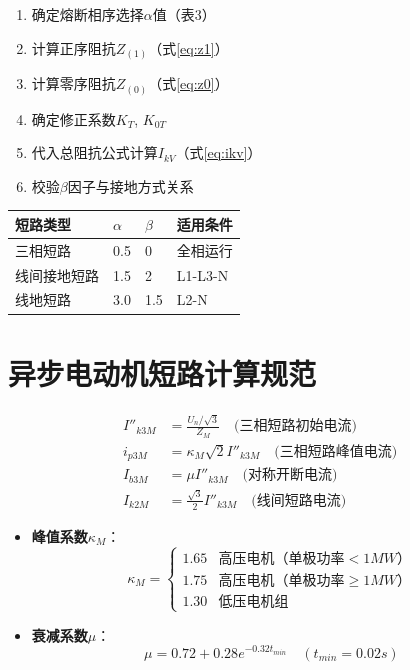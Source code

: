 \documentclass[a4paper,11pt,AutoFakeBold]{ctexart}
\begin{document}
\begin{enumerate}
\item 确定熔断相序选择$\alpha$值（表3）
\item 计算正序阻抗$Z_{(1)}$（式\ref{eq:z1}）
\item 计算零序阻抗$Z_{(0)}$（式\ref{eq:z0}）
\item 确定修正系数$K_T$, $K_{0T}$
\item 代入总阻抗公式计算$I_{kV}$（式\ref{eq:ikv}）
\item 校验$\beta$因子与接地方式关系
\end{enumerate}


\begin{tabular}{llll}
短路类型 & $\alpha$ & $\beta$ & 适用条件 \\
\hline
三相短路 & 0.5 & 0 & 全相运行 \\
线间接地短路 & 1.5 & 2 & L1-L3-N \\
线地短路 & 3.0 & 1.5 & L2-N \\
\end{tabular}

\newpage
\section{异步电动机短路计算规范}

\begin{align}
I''_{k3M} &= \frac{U_n/\sqrt{3}}{Z_M} \quad \text{(三相短路初始电流)} \label{eq:ik3m} \\
i_{p3M} &= \kappa_M \sqrt{2} I''_{k3M} \quad \text{(三相短路峰值电流)} \label{eq:ip3m} \\
I_{b3M} &= \mu I''_{k3M} \quad \text{(对称开断电流)} \label{eq:ib3m} \\
I_{k2M} &= \frac{\sqrt{3}}{2} I''_{k3M} \quad \text{(线间短路电流)} \label{eq:ik2m}
\end{align}


\begin{itemize}
\item \textbf{峰值系数$\kappa_M$}：
  \[
  \kappa_M = 
  \begin{cases}
  1.65 & \text{高压电机（单极功率}< 1 MW ） \\
  1.75 & \text{高压电机（单极功率}\geq 1 MW） \\
  1.30 & \text{低压电机组}
  \end{cases}
  \]
  
\item \textbf{衰减系数$\mu$}：
  \[
  \mu = 0.72 + 0.28e^{-0.32t_{min}} \quad (t_{min}=0.02\si{s})
  \]
\end{itemize}
\end{document}
